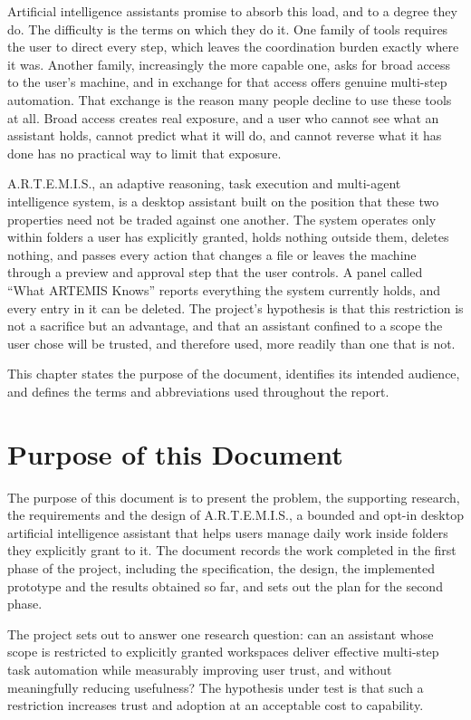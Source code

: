 \documentclass{FastFyp}
\begin{document}
Artificial intelligence assistants promise to absorb this load, and to a degree they do. The difficulty is the terms on which they do it. One family of tools requires the user to direct every step, which leaves the coordination burden exactly where it was. Another family, increasingly the more capable one, asks for broad access to the user's machine, and in exchange for that access offers genuine multi-step automation. That exchange is the reason many people decline to use these tools at all. Broad access creates real exposure, and a user who cannot see what an assistant holds, cannot predict what it will do, and cannot reverse what it has done has no practical way to limit that exposure.

A.R.T.E.M.I.S., an adaptive reasoning, task execution and multi-agent intelligence system, is a desktop assistant built on the position that these two properties need not be traded against one another. The system operates only within folders a user has explicitly granted, holds nothing outside them, deletes nothing, and passes every action that changes a file or leaves the machine through a preview and approval step that the user controls. A panel called ``What ARTEMIS Knows'' reports everything the system currently holds, and every entry in it can be deleted. The project's hypothesis is that this restriction is not a sacrifice but an advantage, and that an assistant confined to a scope the user chose will be trusted, and therefore used, more readily than one that is not.

This chapter states the purpose of the document, identifies its intended audience, and defines the terms and abbreviations used throughout the report.

\section{Purpose of this Document}
The purpose of this document is to present the problem, the supporting research, the requirements and the design of A.R.T.E.M.I.S., a bounded and opt-in desktop artificial intelligence assistant that helps users manage daily work inside folders they explicitly grant to it. The document records the work completed in the first phase of the project, including the specification, the design, the implemented prototype and the results obtained so far, and sets out the plan for the second phase.

The project sets out to answer one research question: can an assistant whose scope is restricted to explicitly granted workspaces deliver effective multi-step task automation while measurably improving user trust, and without meaningfully reducing usefulness? The hypothesis under test is that such a restriction increases trust and adoption at an acceptable cost to capability.
\end{document}
